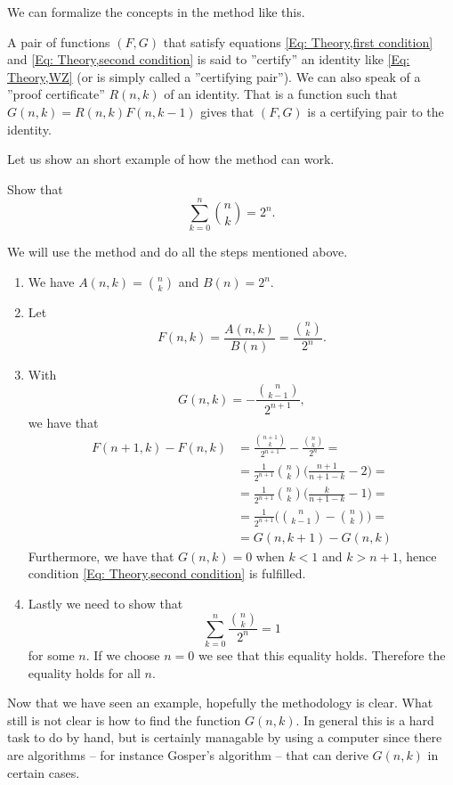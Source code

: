 We can formalize the concepts in the method like this.
\begin{definition}
  A pair of functions $(F,G)$ that satisfy equations \ref{Eq: Theory,first condition} and \ref{Eq: Theory,second condition} is said to ''certify'' an identity like \ref{Eq: Theory,WZ} (or is simply called a ''certifying pair''). We can also speak of a ''proof certificate'' $R(n,k)$ of an identity. That is a function such that $G(n,k)=R(n,k)F(n,k-1)$ gives that $(F,G)$ is a certifying pair to the identity.
\end{definition}
Let us show an short example of how the method can work.
\begin{example}
  Show that $$\sum_{k=0}^n \binom{n}{k} = 2^n.$$
\end{example}
\begin{solution}
  We will use the method and do all the steps mentioned above.
  \begin{enumerate}
    \item We have $A(n,k)=\binom{n}{k}$ and $B(n)=2^n$.
    \item Let $$F(n,k)=\frac{A(n,k)}{B(n)}=\frac{\binom{n}{k}}{2^n}.$$
    \item With $$G(n,k)=-\frac{\binom{n}{k-1}}{2^{n+1}},$$ we have that
      \begin{equation*}
        \begin{split}
          F(n+1,k)-F(n,k) & = \frac{\binom{n+1}{k}}{2^{n+1}}-\frac{\binom{n}{k}}{2^{n}}= \\
          & = \frac{1}{2^{n+1}}\binom{n}{k}\Bigg(\frac{n+1}{n+1-k}-2\Bigg) = \\
          & = \frac{1}{2^{n+1}}\binom{n}{k}\Bigg(\frac{k}{n+1-k}-1\Bigg) = \\
          & = \frac{1}{2^{n+1}}\Bigg(\binom{n}{k-1}-\binom{n}{k}\Bigg) = \\
          & = G(n,k+1)-G(n,k)
        \end{split}
      \end{equation*}
      Furthermore, we have that $G(n,k) = 0$ when $k<1$ and $k>n+1$, hence condition \ref{Eq: Theory,second condition} is fulfilled.
    \item Lastly we need to show that $$\sum_{k=0}^n \frac{\binom{n}{k}}{2^n}=1$$ for some $n$. If we choose $n=0$ we see that this equality holds. Therefore the equality holds for all $n$.
  \end{enumerate}
\end{solution}
Now that we have seen an example, hopefully the methodology is clear. What still is not clear is how to find the function $G(n,k)$. In general this is a hard task to do by hand, but is certainly managable by using a computer since there are algorithms -- for instance Gosper's algorithm -- that can derive $G(n,k)$ in certain cases.

